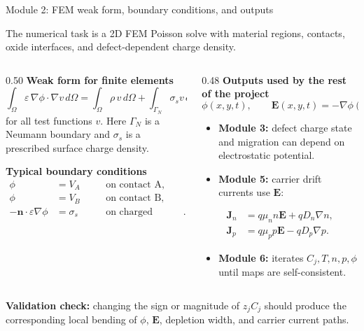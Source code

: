 \documentclass[aspectratio=169,9pt]{beamer}
\newcommand{\Evec}{\bm{E}}
\newcommand{\nvec}{\bm{n}}
\newcommand{\OmegaD}{\Omega}
\begin{document}
\begin{frame}{Module 2: FEM weak form, boundary conditions, and outputs}
\footnotesize
\vspace{-4mm}
\begin{bluebox}
\centering\small
The numerical task is a 2D FEM Poisson solve with material regions, contacts, oxide interfaces, and defect-dependent charge density.
\end{bluebox}

\vspace{1mm}
\begin{columns}[T,totalwidth=\textwidth]
\begin{column}{0.50\textwidth}
\textbf{Weak form for finite elements}
\begin{equation*}
\boxed{
\int_{\OmegaD}\varepsilon\,\nabla\phi\cdot\nabla v\,d\Omega
=
\int_{\OmegaD}\rho\,v\,d\Omega
+\int_{\Gamma_N}\sigma_s v\,d\Gamma}
\end{equation*}
\small
for all test functions \(v\). Here \(\Gamma_N\) is a Neumann boundary and \(\sigma_s\) is a prescribed surface charge density.

\vspace{1mm}
\textbf{Typical boundary conditions}
\begin{align*}
\phi &= V_A \quad &&\text{on contact A},\\
\phi &= V_B \quad &&\text{on contact B},\\
-\nvec\cdot\varepsilon\nabla\phi &= \sigma_s \quad &&\text{on charged interfaces}.
\end{align*}
\end{column}

\begin{column}{0.48\textwidth}
\textbf{Outputs used by the rest of the project}
\begin{equation*}
\boxed{\phi(x,y,t)},\qquad
\boxed{\Evec(x,y,t)=-\nabla\phi(x,y,t)}
\end{equation*}
\small
\begin{itemize}\setlength\itemsep{0.3mm}
\item \textbf{Module 3:} defect charge state and migration can depend on electrostatic potential.
\item \textbf{Module 5:} carrier drift currents use \(\Evec\):
\end{itemize}
\begin{align*}
\bm{J}_n&=q\mu_n n\Evec+qD_n\nabla n,\\[-0.5mm]
\bm{J}_p&=q\mu_p p\Evec-qD_p\nabla p.
\end{align*}
\begin{itemize}\setlength\itemsep{0.3mm}
\item \textbf{Module 6:} iterates \(C_j,T,n,p,\phi\) until maps are self-consistent.
\end{itemize}
\end{column}
\end{columns}

\vspace{1mm}
\begin{greenbox}
\centering\scriptsize
\textbf{Validation check:} changing the sign or magnitude of \(z_jC_j\) should produce the corresponding local bending of \(\phi\), \(\Evec\), depletion width, and carrier current paths.
\end{greenbox}
\end{frame}
\end{document}
